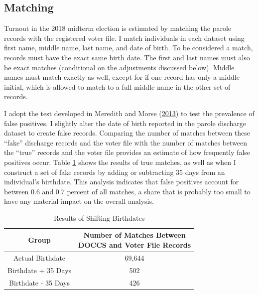 \documentclass[
  12pt,
]{article}
\begin{document}
\hypertarget{matching}{%
\subsection*{Matching}\label{matching}}

Turnout in the 2018 midterm election is estimated by matching the parole records with the registered voter file. I match individuals in each dataset using first name, middle name, last name, and date of birth. To be considered a match, records must have the exact same birth date. The first and last names must also be exact matches (conditional on the adjustments discussed below). Middle names must match exactly as well, except for if one record has only a middle initial, which is allowed to match to a full middle name in the other set of records.

I adopt the test developed in Meredith and Morse (\protect\hyperlink{ref-Meredith2013}{2013}) to test the prevalence of false positives. I slightly alter the date of birth reported in the parole discharge dataset to create false records. Comparing the number of matches between these ``fake'' discharge records and the voter file with the number of matches between the ``true'' records and the voter file provides an estimate of how frequently false positives occur. Table \ref{tab:change-dobs} shows the results of true matches, as well as when I construct a set of fake records by adding or subtracting 35 days from an individual's birthdate. This analysis indicates that false positives account for between 0.6 and 0.7 percent of all matches, a share that is probably too small to have any material impact on the overall analysis.

\begin{singlespace}
\begin{table}[H]

\caption{\label{tab:shift-dobs-chunk}\label{tab:change-dobs} Results of Shifting Birthdates}
\centering
\begin{tabular}[t]{cc}
\toprule
Group & \makecell[l]{Number of Matches Between\\DOCCS and Voter File Records}\\
\midrule
Actual Birthdate & 69,644\\
Birthdate + 35 Days & 502\\
Birthdate - 35 Days & 426\\
\bottomrule
\end{tabular}
\end{table}
\end{singlespace}
\end{document}
